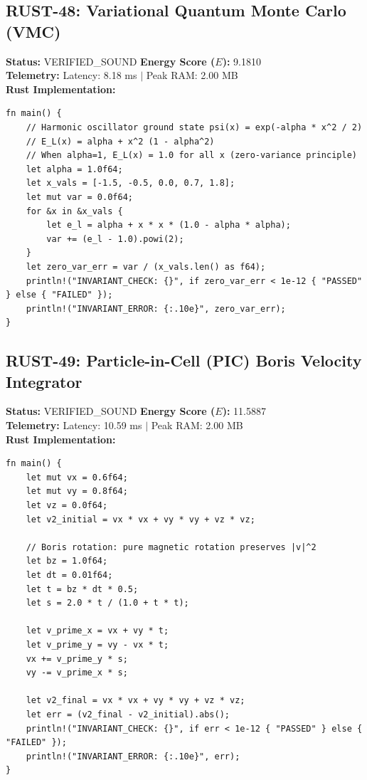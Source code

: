 \documentclass[11pt, a4paper]{article}
\begin{document}
\subsection{RUST-48: Variational Quantum Monte Carlo (VMC)}
\textbf{Status:} VERIFIED\_SOUND \hfill \textbf{Energy Score ($E$):} 9.1810\\
\textbf{Telemetry:} Latency: 8.18 ms $|$ Peak RAM: 2.00 MB\\
\textbf{Rust Implementation:}
\begin{verbatim}
fn main() {
    // Harmonic oscillator ground state psi(x) = exp(-alpha * x^2 / 2)
    // E_L(x) = alpha + x^2 (1 - alpha^2)
    // When alpha=1, E_L(x) = 1.0 for all x (zero-variance principle)
    let alpha = 1.0f64;
    let x_vals = [-1.5, -0.5, 0.0, 0.7, 1.8];
    let mut var = 0.0f64;
    for &x in &x_vals {
        let e_l = alpha + x * x * (1.0 - alpha * alpha);
        var += (e_l - 1.0).powi(2);
    }
    let zero_var_err = var / (x_vals.len() as f64);
    println!("INVARIANT_CHECK: {}", if zero_var_err < 1e-12 { "PASSED" } else { "FAILED" });
    println!("INVARIANT_ERROR: {:.10e}", zero_var_err);
}
\end{verbatim}

\subsection{RUST-49: Particle-in-Cell (PIC) Boris Velocity Integrator}
\textbf{Status:} VERIFIED\_SOUND \hfill \textbf{Energy Score ($E$):} 11.5887\\
\textbf{Telemetry:} Latency: 10.59 ms $|$ Peak RAM: 2.00 MB\\
\textbf{Rust Implementation:}
\begin{verbatim}
fn main() {
    let mut vx = 0.6f64;
    let mut vy = 0.8f64;
    let vz = 0.0f64;
    let v2_initial = vx * vx + vy * vy + vz * vz;
    
    // Boris rotation: pure magnetic rotation preserves |v|^2
    let bz = 1.0f64;
    let dt = 0.01f64;
    let t = bz * dt * 0.5;
    let s = 2.0 * t / (1.0 + t * t);
    
    let v_prime_x = vx + vy * t;
    let v_prime_y = vy - vx * t;
    vx += v_prime_y * s;
    vy -= v_prime_x * s;
    
    let v2_final = vx * vx + vy * vy + vz * vz;
    let err = (v2_final - v2_initial).abs();
    println!("INVARIANT_CHECK: {}", if err < 1e-12 { "PASSED" } else { "FAILED" });
    println!("INVARIANT_ERROR: {:.10e}", err);
}
\end{verbatim}
\end{document}

